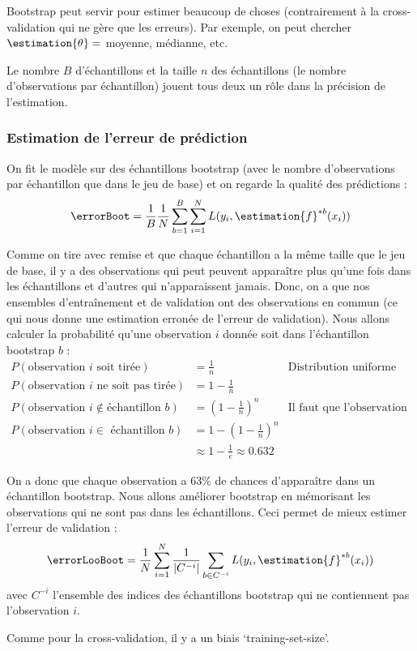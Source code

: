         Bootstrap peut servir pour estimer beaucoup de choses (contrairement à la cross-validation qui ne gère que les erreurs). Par exemple, on peut chercher \(\estimation{\theta} = \) moyenne, médianne, etc.

        Le nombre \(B\) d'échantillons et la taille \(n\) des échantillons (le nombre d'observations par échantillon) jouent tous deux un rôle dans la précision de l'estimation.

        \subsubsection{Estimation de l'erreur de prédiction}
            On fit le modèle sur des échantillons bootstrap (avec le nombre d'observations par échantillon que dans le jeu de base) et on regarde la qualité des prédictions :
            \[
                \errorBoot = \frac{1}{B}\frac{1}{N} \sum_{b=1}^B \sum_{i=1}^N L(y_i, \estimation{f}^{*b}(x_i))
            \]

            Comme on tire avec remise et que chaque échantillon a la même taille que le jeu de base, il y a des observations qui peut peuvent apparaître plus qu'une fois dans les échantillons et d'autres qui n'apparaissent jamais. Donc, on a que nos ensembles d'entraînement et de validation ont des observations en commun (ce qui nous donne une estimation erronée de l'erreur de validation). Nous allons calculer la probabilité qu'une observation \(i\) donnée soit dans l'échantillon bootstrap \(b\) :
            \begin{align*}
                P(\text{observation \(i\) soit tirée}) &= \frac{1}{n} & \text{Distribution uniforme}\\
                P(\text{observation \(i\) ne soit pas tirée}) &= 1 - \frac{1}{n}\\
                P(\text{observation } i \not\in \text{échantillon } b) &= (1 - \frac{1}{n})^n & \text{Il faut que l'observation ne soit jamais tirée}\\
                P(\text{observation \(i \in\) échantillon \(b\)}) &= 1 - (1 - \frac{1}{n})^n \\
                &\approx 1 - \frac{1}{e} \approx 0.632
            \end{align*}

            On a donc que chaque observation a 63\% de chances d'apparaître dans un échantillon bootstrap. Nous allons améliorer bootstrap en mémorisant les observations qui ne sont pas dans les échantillons. Ceci permet de mieux estimer l'erreur de validation :
            \[
                \errorLooBoot = \frac{1}{N} \sum_{i=1}^N \frac{1}{|C^{-i}|} \sum_{b \in C^{-i}} L(y_i, \estimation{f}^{*b} (x_i))
            \]
            avec \(C^{-i}\) l'ensemble des indices des échantillons bootstrap qui ne contiennent pas l'observation \(i\).

            Comme pour la cross-validation, il y a un biais `training-set-size'.